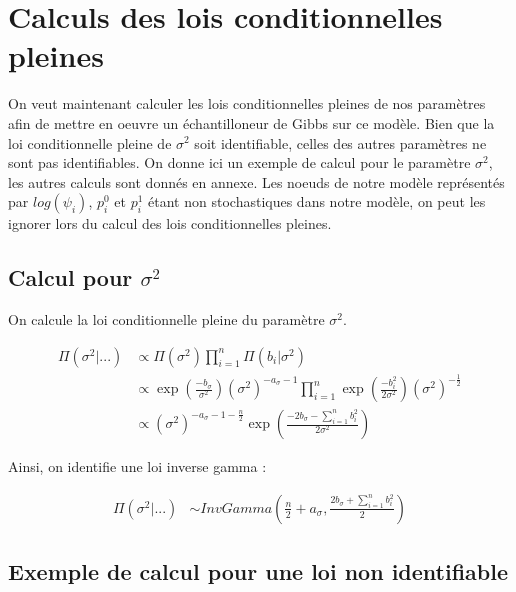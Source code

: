 \documentclass[
]{article}
\begin{document}
\hypertarget{calculs-des-lois-conditionnelles-pleines}{%
\section{Calculs des lois conditionnelles
pleines}\label{calculs-des-lois-conditionnelles-pleines}}

On veut maintenant calculer les lois conditionnelles pleines de nos
paramètres afin de mettre en oeuvre un échantilloneur de Gibbs sur ce
modèle. Bien que la loi conditionnelle pleine de \(\sigma^2\) soit
identifiable, celles des autres paramètres ne sont pas identifiables. On
donne ici un exemple de calcul pour le paramètre \(\sigma ^2\), les
autres calculs sont donnés en annexe. Les noeuds de notre modèle
représentés par \(log(\psi_i)\), \(p_i^0\) et \(p_i^1\) étant non
stochastiques dans notre modèle, on peut les ignorer lors du calcul des
lois conditionnelles pleines.

\hypertarget{calcul-pour-sigma2}{%
\subsection{\texorpdfstring{Calcul pour
\(\sigma^2\)}{Calcul pour \textbackslash sigma\^{}2}}\label{calcul-pour-sigma2}}

On calcule la loi conditionnelle pleine du paramètre \(\sigma^2\).

\begin{align*}
\Pi(\sigma^2|...) &\propto \Pi(\sigma^2) \prod_{i=1}^n\Pi(b_i|\sigma^2) \\
&\propto \exp\left({\frac{-b_{\sigma}}{\sigma^2}}\right)(\sigma^2)^{-a_{\sigma}-1}\prod_{i=1}^{n} \exp\left(\frac{-b_i^2}{2\sigma^2}\right)(\sigma^2)^{-\frac{1}{2}} \\
&\propto (\sigma^2)^{-a_{\sigma}-1-\frac{n}{2}} \exp\left(\frac{-2b_{\sigma}-\sum\limits_{i=1}^n b_i^2}{2\sigma^2}\right)
\end{align*}

Ainsi, on identifie une loi inverse gamma :

\begin{align*}
\Pi(\sigma^2|...) &\sim InvGamma(\frac{n}{2}+a_{\sigma},\frac{2b_{\sigma}+\sum\limits_{i=1}^n b_i^2}{2})
\end{align*}

\hypertarget{exemple-de-calcul-pour-une-loi-non-identifiable}{%
\subsection{Exemple de calcul pour une loi non
identifiable}\label{exemple-de-calcul-pour-une-loi-non-identifiable}}
\end{document}
